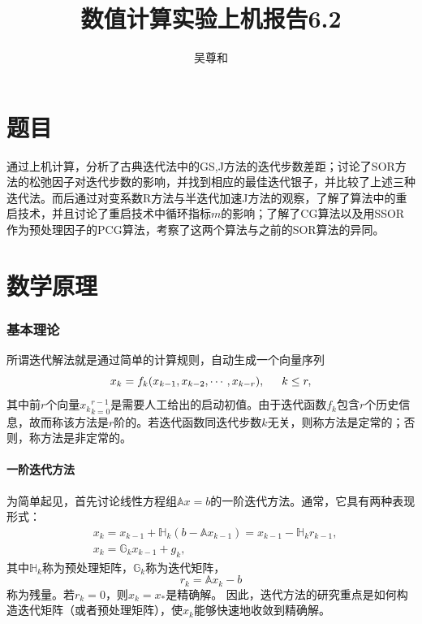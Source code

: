 \documentclass[10pt]{article}
\title{{\Huge 数值计算实验上机报告6.2}\\}
\author{吴尊和}
\begin{document}
  \maketitle
  \flushbottom
  \newpage
  \pagestyle{fancynotes}
  \part{题目}
  通过上机计算，分析了古典迭代法中的GS,J方法的迭代步数差距；讨论了SOR方法的松弛因子对迭代步数的影响，并找到相应的最佳迭代银子，并比较了上述三种迭代法。而后通过对变系数R方法与半迭代加速J方法的观察，了解了算法中的重启技术，并且讨论了重启技术中循环指标$m$的影响；了解了CG算法以及用SSOR作为预处理因子的PCG算法，考察了这两个算法与之前的SOR算法的异同。
  
  \newpage
  \pagestyle{fancynotes}
  \part{数学原理}
  \section{基本理论}
  \indent 所谓迭代解法就是通过简单的计算规则，自动生成一个向量序列
  \begin{equation}x_k=f_k(x_{k-1},x_{k-2},\cdots,x_{k-r}),\indent k\leq r,
  \end{equation}
  其中前$r$个向量${x_k}_{k=0}^{r-1}$是需要人工给出的启动初值。由于迭代函数$f_k$包含$r$个历史信息，故而称该方法是$r$阶的。若迭代函数同迭代步数$k$无关，则称方法是定常的；否则，称方法是非定常的。
  \subsection{一阶迭代方法}
  为简单起见，首先讨论线性方程组$\mathbb{A}x=b$的一阶迭代方法。通常，它具有两种表现形式：
  \begin{align}
  &x_k=x_{k-1}+\mathbb{H}_k(b-\mathbb{A}x_{k-1})=x_{k-1}-\mathbb{H}_kr_{k-1},\\
  &x_k=\mathbb{G}_kx_{k-1}+g_k,
  \end{align}
  其中$\mathbb{H}_k$称为预处理矩阵，$\mathbb{G}_k$称为迭代矩阵，
  $$r_k=\mathbb{A}x_k-b$$称为残量。若$r_k=0$，则$x_k=x_*$是精确解。\newline
  因此，迭代方法的研究重点是如何构造迭代矩阵（或者预处理矩阵），使$x_k$能够快速地收敛到精确解。
\end{document}
